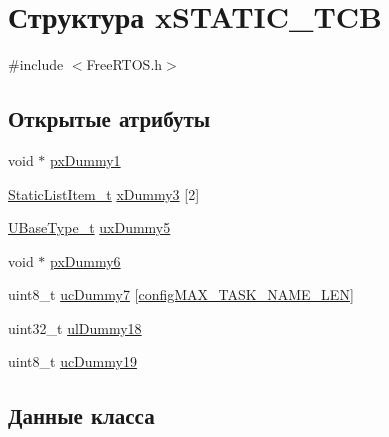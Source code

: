 \hypertarget{structx_s_t_a_t_i_c___t_c_b}{}\section{Структура x\+S\+T\+A\+T\+I\+C\+\_\+\+T\+CB}
\label{structx_s_t_a_t_i_c___t_c_b}


{\ttfamily \#include $<$Free\+R\+T\+O\+S.\+h$>$}

\subsection*{Открытые атрибуты}
\begin{DoxyCompactItemize}
\item 
void $\ast$ \mbox{\hyperlink{structx_s_t_a_t_i_c___t_c_b_a2f66b620fdeb13f8969f27e1bbb4d1d1}{px\+Dummy1}}
\item 
\mbox{\hyperlink{_free_r_t_o_s_8h_a1d31bc0472385a87424518da484d9e09}{Static\+List\+Item\+\_\+t}} \mbox{\hyperlink{structx_s_t_a_t_i_c___t_c_b_a7f182aa8f5003494f63d975dabcb3ec1}{x\+Dummy3}} \mbox{[}2\mbox{]}
\item 
\mbox{\hyperlink{portmacro_8h_a646f89d4298e4f5afd522202b11cb2e6}{U\+Base\+Type\+\_\+t}} \mbox{\hyperlink{structx_s_t_a_t_i_c___t_c_b_ab950bb498901ef7291e49086e5a2efd0}{ux\+Dummy5}}
\item 
void $\ast$ \mbox{\hyperlink{structx_s_t_a_t_i_c___t_c_b_a416495e152e5caef64994f72329c60b0}{px\+Dummy6}}
\item 
uint8\+\_\+t \mbox{\hyperlink{structx_s_t_a_t_i_c___t_c_b_a308771ccd6723cad777695d84a0a2a30}{uc\+Dummy7}} \mbox{[}\mbox{\hyperlink{_free_r_t_o_s_config_8h_ac388dc4041aab6997348828eb27fc1a8}{config\+M\+A\+X\+\_\+\+T\+A\+S\+K\+\_\+\+N\+A\+M\+E\+\_\+\+L\+EN}}\mbox{]}
\item 
uint32\+\_\+t \mbox{\hyperlink{structx_s_t_a_t_i_c___t_c_b_ade6781276f913dcd592ee0f6cce76c7e}{ul\+Dummy18}}
\item 
uint8\+\_\+t \mbox{\hyperlink{structx_s_t_a_t_i_c___t_c_b_aa98151056a161f180013ae36dae0d17b}{uc\+Dummy19}}
\end{DoxyCompactItemize}


\subsection{Данные класса}
\mbox{\label{structx_s_t_a_t_i_c___t_c_b_a2f66b620fdeb13f8969f27e1bbb4d1d1}} 
